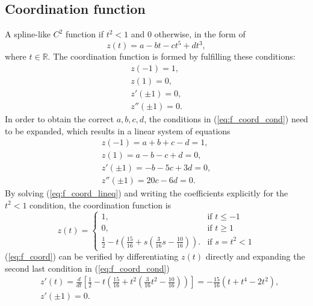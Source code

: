 \documentclass[12pt]{article}
\begin{document}
\subsection{Coordination function}
A spline-like $C^2$ function if $t^2<1$ and $0$ otherwise, in the form of
\begin{equation}
    z(t) = a - bt - ct^5 + dt^3,
    \label{eq:f_z}
\end{equation}
where $t \in \mathbb{R}$. The coordination function is formed by fulfilling these conditions:
\begin{equation}
    \begin{split}
        z(-1) = 1, \\
        z(1) = 0, \\
        z'(\pm 1) = 0, \\
        z''(\pm 1) = 0.
    \end{split}
    \label{eq:f_coord_cond}
\end{equation}
In order to obtain the correct $a, b, c, d$, the conditions in (\ref{eq:f_coord_cond}) need to be expanded, which results in a linear system of equations
\begin{equation}
    \begin{split}
        z(-1) = a + b + c - d = 1, \\
        z(1) = a - b - c + d = 0, \\
        z'(\pm 1) = -b -5c +3d = 0, \\
        z''(\pm 1) = 20c - 6d = 0.
    \end{split}
    \label{eq:f_coord_lineq}
\end{equation}
By solving (\ref{eq:f_coord_lineq}) and writing the coefficients explicitly for the $t^2 < 1$ condition, the coordination function is
\begin{equation}
    z(t) = 
    \begin{cases}
        1, & \text{if } t \leq -1 \\
        0, & \text{if } t \geq 1 \\
        \frac{1}{2}-t\left(\frac{15}{16}+s \left(\frac{3}{16}s -\frac{10}{16}\right)\right). & \text{if } s=t^2 < 1
    \end{cases}
    \label{eq:f_coord}
\end{equation}
(\ref{eq:f_coord}) can be verified by differentiating $z(t)$ directly and expanding the second last condition in (\ref{eq:f_coord_cond})
\begin{equation}
    \begin{split}
        &z'(t) = \frac{d}{dt}\left[ \frac{1}{2}-t\left(\frac{15}{16}+t^2 \left(\frac{3}{16}t^2 -\frac{10}{16}\right)\right)\right] = -\frac{15}{16}(t+t^4-2t^2), \\
        &z'(\pm 1) = 0.
    \end{split}
\end{equation}
\end{document}
